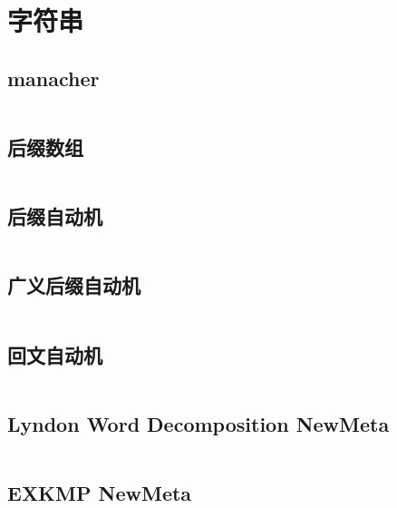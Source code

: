 \twocolumn
\chapter{字符串}
\section{manacher}
\inputminted{cpp}{./string/manacher.cpp}
\section{后缀数组}
\inputminted{cpp}{./string/SA.cpp}
\section{后缀自动机}
\inputminted{cpp}{./string/SAM.cpp}
\section{广义后缀自动机}
\inputminted{cpp}{./string/general_SAM.cpp}
\section{回文自动机}
\inputminted{cpp}{./string/pam.cpp}
\section{Lyndon Word Decomposition  NewMeta}
\inputminted{cpp}{./string/Lyndon_Word_Decomposition-NewMeta.cpp}
\section{EXKMP  NewMeta}
\inputminted{cpp}{./string/EXKMP-NewMeta.cpp}